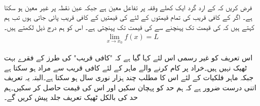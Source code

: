 \\
فرض کریں کہ  کے ارد گرد  ایک کھلے وقفہ پر تفاعل  معین ہے جبکہ عین نقطہ  پر  غیر معین ہو سکتا ہے۔ اگر  کے کافی قریب  کی  تمام قیمتوں کے لئے  کی قیمتیں  کے کافی قریب پائی جاتی ہوں تب ہم کہتے ہیں کہ  کی قیمت  تک پہنچنے سے  کی قیمت   تک پہنچتی ہے۔ اس کو ہم درج ذیل لکھتے ہیں۔
\begin{align*}
\lim_{x\to x_0} f(x)=L
\end{align*}

اس تعریف کو غیر رسمی اس لئے کہا گیا ہے کہ "کافی قریب" کی طرز کے فقرے بہت ٹھیک نہیں ہیں۔خراد پر کام کرنے والے ماہر کے لئے کافی قریب سے مراد  ہو سکتا ہے جبکہ ماہر فلکیات کے لئے اس کا مطلب چند ہزار نوری سال ہو سکتا ہے۔البتہ یہ تعریف اتنی درست ضرور ہے کہ ہم حد کو پہچان سکیں اور اس کی قیمت حاصل کر سکیں۔ہم حد کی بالکل ٹھیک تعریف جلد پیش کریں گے۔

